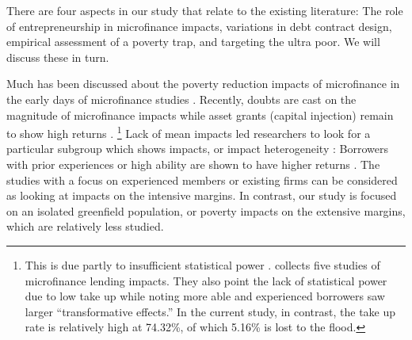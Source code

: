 	There are four aspects in our study that relate to the existing literature: The role of entrepreneurship in microfinance impacts, variations in debt contract design, empirical assessment of a poverty trap, and targeting the ultra poor. We will discuss these in turn.

	Much has been discussed about the poverty reduction impacts of microfinance in the early days of microfinance studies \citep{Morduch1999}. Recently, doubts are cast on the magnitude of microfinance impacts \citep{BanerjeeKarlanZinman2015, DuvendackMader2019, Meager2019} while asset grants (capital injection) remain to show high returns \citep{deMel2008, DeMel2014, FafchampsFlypaper2014, BandieraBRAC2017}. \footnote{This is due partly to insufficient statistical power \citep{MckenzieWoodruff2013}. \citet{BanerjeeKarlanZinman2015} collects five studies of microfinance lending impacts. They also point the lack of statistical power due to low take up while noting more able and experienced borrowers saw larger ``transformative effects.'' %
	In the current study, in contrast, the take up rate is relatively high at 74.32\%, of which 5.16\% is lost to the flood.  } Lack of mean impacts led researchers to look for a particular subgroup which shows impacts, or impact heterogeneity \citep{Banerjee2017HyderabadFollowup}: Borrowers with prior experiences or high ability are shown to have higher returns \citep{Banerjee2015Miracle, Mckenzie2017Spurring, Buera2017, Banerjee2019MFPovertyTrap}. The studies with a focus on experienced members or existing firms can be considered as looking at impacts on the intensive margins. In contrast, our study is focused on an isolated greenfield population, or poverty impacts on the extensive margins, which are relatively less studied.

